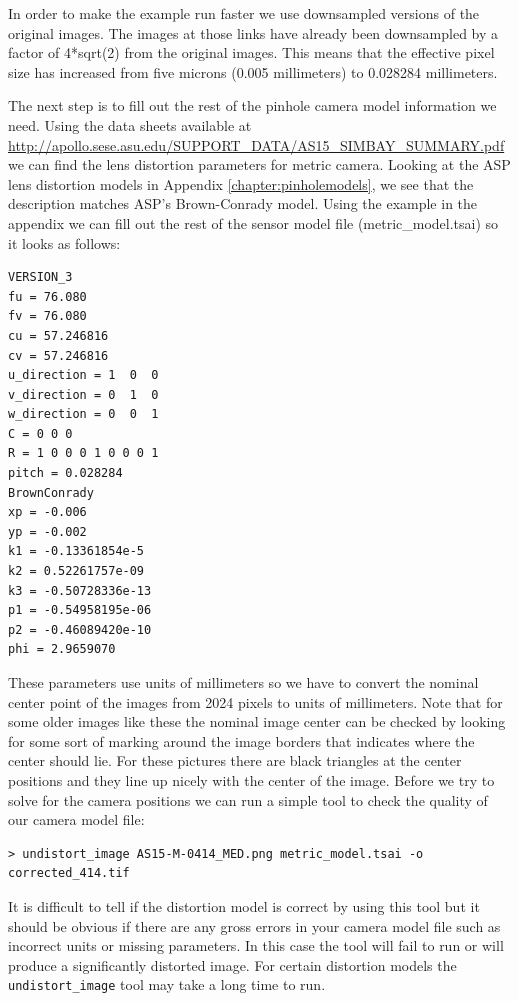 In order to make the example run faster we use downsampled versions of
the original images.  The images at those links have already been downsampled
by a factor of 4*sqrt(2) from the original images.  This means that the
effective pixel size has increased from five microns (0.005 millimeters) to
0.028284 millimeters.

The next step is to fill out the rest of the pinhole camera model information
we need.  Using the data sheets available at 
\url{http://apollo.sese.asu.edu/SUPPORT_DATA/AS15_SIMBAY_SUMMARY.pdf} 
we can find the lens distortion parameters for metric camera.  Looking at the 
ASP lens distortion models in Appendix \ref{chapter:pinholemodels}, 
we see that the description matches ASP's Brown-Conrady model.  
Using the example in the appendix we can fill out
the rest of the sensor model file (metric\_model.tsai) so it looks as follows:

\begin{verbatim}
VERSION_3
fu = 76.080
fv = 76.080
cu = 57.246816
cv = 57.246816
u_direction = 1  0  0
v_direction = 0  1  0
w_direction = 0  0  1
C = 0 0 0
R = 1 0 0 0 1 0 0 0 1
pitch = 0.028284
BrownConrady
xp = -0.006
yp = -0.002
k1 = -0.13361854e-5
k2 = 0.52261757e-09
k3 = -0.50728336e-13
p1 = -0.54958195e-06
p2 = -0.46089420e-10
phi = 2.9659070
\end{verbatim}

These parameters use units of millimeters so we have to convert the nominal center
point of the images from 2024 pixels to units of millimeters.  Note that for some older
images like these the nominal image center can be checked by looking for some sort of
marking around the image borders that indicates where the center should lie.  For these
pictures there are black triangles at the center positions and they line up nicely
with the center of the image.  Before we try to solve for the camera positions we can run
a simple tool to check the quality of our camera model file:
\begin{verbatim}
> undistort_image AS15-M-0414_MED.png metric_model.tsai -o corrected_414.tif
\end{verbatim}

It is difficult to tell if the distortion model is correct by using this
tool but it should be obvious if there are any gross errors in your
camera model file such as incorrect units or missing parameters.  In this
case the tool will fail to run or will produce a significantly distorted image.
For certain distortion models the \texttt{undistort\_image} tool may take a long time to run.

